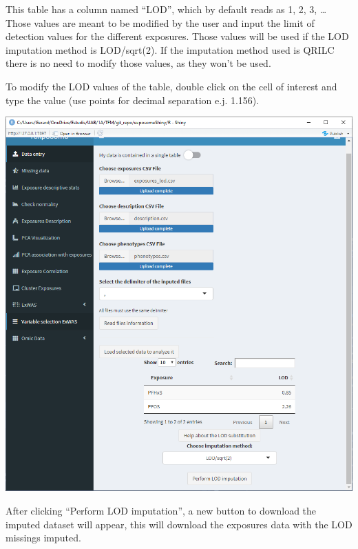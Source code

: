 \documentclass[
]{book}
\begin{document}
This table has a column named ``LOD'', which by default reads as 1, 2, 3, \ldots{} Those values are meant to be modified by the user and input the limit of detection values for the different exposures. Those values will be used if the LOD imputation method is LOD/sqrt(2). If the imputation method used is QRILC there is no need to modify those values, as they won't be used.

To modify the LOD values of the table, double click on the cell of interest and type the value (use points for decimal separation e.j. 1.156).

\includegraphics{images/analysis1_2_4.png}

After clicking ``Perform LOD imputation'', a new button to download the imputed dataset will appear, this will download the exposures data with the LOD missings imputed.
\end{document}
